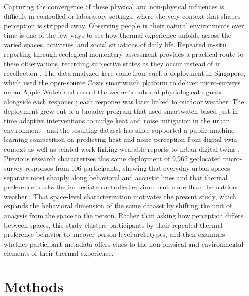 \documentclass[final,5p,times,twocolumn]{elsarticle}
\begin{document}
Capturing the convergence of these physical and non-physical influences is difficult in controlled or laboratory settings, where the very context that shapes perception is stripped away.
Observing people in their natural environments over time is one of the few ways to see how thermal experience unfolds across the varied spaces, activities, and social situations of daily life.
Repeated in-situ reporting through ecological momentary assessment provides a practical route to these observations, recording subjective states as they occur instead of in recollection \citep{Stone1994-he}.
The data analyzed here come from such a deployment in Singapore, which used the open-source Cozie smartwatch platform to deliver micro-surveys on an Apple Watch and record the wearer's onboard physiological signals alongside each response \citep{Tartarini2023-iu}; each response was later linked to outdoor weather.
The deployment grew out of a broader program that used smartwatch-based just-in-time adaptive interventions to nudge heat and noise mitigation in the urban environment \citep{Miller2022-dy, Miller2025-sv}, and the resulting dataset has since supported a public machine-learning competition on predicting heat and noise perception from digital-twin context \citep{Miller2023-wi, Miller2025-qu} as well as related work linking wearable reports to urban digital twins \citep{Ignatius2024-ii, Lei2026-dn}.
Previous research characterizes this same deployment of 9{,}962 geolocated micro-survey responses from 106 participants, showing that everyday urban spaces separate most sharply along behavioral and acoustic lines and that thermal preference tracks the immediate controlled environment more than the outdoor weather \citep{Miller2026-cs}.
That space-level characterization motivates the present study, which expands the behavioral dimension of the same dataset by shifting the unit of analysis from the space to the person.
Rather than asking how perception differs between spaces, this study clusters participants by their repeated thermal-preference behavior to uncover person-level archetypes, and then examines whether participant metadata offers clues to the non-physical and environmental elements of their thermal experience.

\section{Methods}\label{sec:methods}
\end{document}
